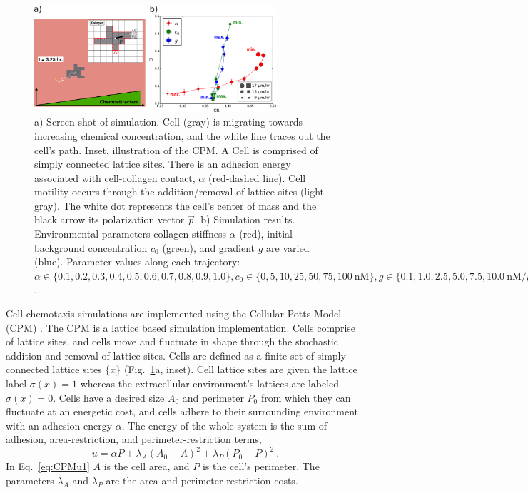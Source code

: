 \begin{figure}
    \centering
    \includegraphics[width=0.80\textwidth]{../fig/ch2_fig3.png}
    \caption{a) Screen shot of simulation. Cell (gray) is migrating towards increasing chemical concentration, and the white line traces out the cell's path. Inset, illustration of the CPM. A Cell is comprised of simply connected lattice sites. There is an adhesion energy associated with cell-collagen contact, $\alpha$ (red-dashed line). Cell motility occurs through the addition/removal of lattice sites (light-gray). The white dot represents the cell's center of mass and the black arrow its polarization vector $\vec{p}$. b) Simulation results. Environmental parameters collagen stiffness $\alpha$ (red), initial background concentration $c_0$ (green), and gradient $g$ are varied (blue).
    Parameter values along each trajectory:
    $\alpha \in \{ 0.1, 0.2, 0.3, 0.4, 0.5, 0.6, 0.7, 0.8, 0.9, 1.0 \},
    c_0 \in \{ 0, 5, 10, 25, 50, 75, 100 \ \text{nM} \},
    g \in \{ 0.1, 1.0, 2.5, 5.0, 7.5, 10.0 \ \text{nM}/\mu\text{m} \}$.}
    \label{fig:ch2_3}
\end{figure}

Cell chemotaxis simulations are implemented using the Cellular Potts Model (CPM) \cite{graner1992simulation,swat2012multi}. The CPM is a lattice based simulation implementation. Cells comprise of lattice sites, and cells move and fluctuate in shape through the stochastic addition and removal of lattice sites. Cells are defined as a finite set of simply connected lattice sites
$\{ x \}$ (Fig.\ \ref{fig:ch2_3}a, inset).
Cell lattice sites are given the lattice label $\sigma(x)=1$ whereas the extracellular environment's lattices are labeled $\sigma(x)=0$. Cells have a desired size $A_0$ and perimeter $P_0$ from which they can fluctuate at an energetic cost, and cells adhere to their surrounding environment with an adhesion energy $\alpha$. The energy of the whole system is the sum of adhesion, area-restriction, and perimeter-restriction terms,
\begin{equation} \label{eq:CPMu1}
    u = \alpha P + \lambda_A(A_0 - A)^2 + \lambda_P(P_0 - P)^2 \ .
\end{equation}
In Eq.\ \ref{eq:CPMu1} $A$ is the cell area, and $P$ is the cell's perimeter. The parameters $\lambda_{A}$ and $\lambda_{P}$ are the area and perimeter restriction costs.

